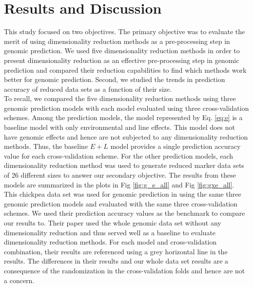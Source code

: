 \section{Results and Discussion}
\label{sec:results}

This study focused on two objectives. The primary objective was to evaluate the merit of using dimensionality reduction methods as a pre-processing step in genomic prediction. We used five dimensionality reduction methods in order to present dimensionality reduction as an effective pre-processing step in genomic prediction and compared their reduction capabilities to find which methods work better for genomic prediction. Second, we studied the trends in prediction accuracy of reduced data sets as a function of their size. \\

To recall, we compared the five dimensionality reduction methods using three genomic prediction models with each model evaluated using three cross-validation schemes. Among the prediction models, the model represented by Eq. \ref{eq:e} is a baseline model with only environmental and line effects. This model does not have genomic effects and hence are not subjected to any dimensionality reduction methods. Thus, the baseline $E+L$ model provides a single prediction accuracy value for each cross-validation scheme. For the other prediction models, each dimensionality reduction method was used to generate reduced marker data sets of 26 different sizes to answer our secondary objective. The results from these models are summarized in the plots in Fig \ref{fig:g_e_all} and Fig \ref{fig:gxe_all}. This chickpea data set was used for genomic prediction in \cite{roorkiwal_genomic-enabled_2018} using the same three genomic prediction models and evaluated with the same three cross-validation schemes. We used their prediction accuracy values as the benchmark to compare our results to. Their paper used the whole genomic data set without any dimensionality reduction and thus served well as a baseline to evaluate dimensionality reduction methods. For each model and cross-validation combination, their results are referenced using a grey horizontal line in the results. The differences in their results and our whole data set results are a consequence of the randomization in the cross-validation folds and hence are not a concern.\\


